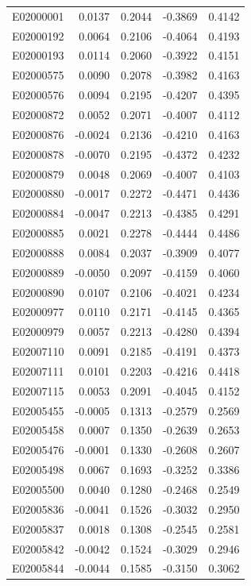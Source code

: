 \documentclass[11pt, a4paper]{article}
\begin{document}
\begin{longtable}{lrrrr}
E02000001 & 0.0137 & 0.2044 & -0.3869 & 0.4142 \\
E02000192 & 0.0064 & 0.2106 & -0.4064 & 0.4193 \\
E02000193 & 0.0114 & 0.2060 & -0.3922 & 0.4151 \\
E02000575 & 0.0090 & 0.2078 & -0.3982 & 0.4163 \\
E02000576 & 0.0094 & 0.2195 & -0.4207 & 0.4395 \\
E02000872 & 0.0052 & 0.2071 & -0.4007 & 0.4112 \\
E02000876 & -0.0024 & 0.2136 & -0.4210 & 0.4163 \\
E02000878 & -0.0070 & 0.2195 & -0.4372 & 0.4232 \\
E02000879 & 0.0048 & 0.2069 & -0.4007 & 0.4103 \\
E02000880 & -0.0017 & 0.2272 & -0.4471 & 0.4436 \\
E02000884 & -0.0047 & 0.2213 & -0.4385 & 0.4291 \\
E02000885 & 0.0021 & 0.2278 & -0.4444 & 0.4486 \\
E02000888 & 0.0084 & 0.2037 & -0.3909 & 0.4077 \\
E02000889 & -0.0050 & 0.2097 & -0.4159 & 0.4060 \\
E02000890 & 0.0107 & 0.2106 & -0.4021 & 0.4234 \\
E02000977 & 0.0110 & 0.2171 & -0.4145 & 0.4365 \\
E02000979 & 0.0057 & 0.2213 & -0.4280 & 0.4394 \\
E02007110 & 0.0091 & 0.2185 & -0.4191 & 0.4373 \\
E02007111 & 0.0101 & 0.2203 & -0.4216 & 0.4418 \\
E02007115 & 0.0053 & 0.2091 & -0.4045 & 0.4152 \\
E02005455 & -0.0005 & 0.1313 & -0.2579 & 0.2569 \\
E02005458 & 0.0007 & 0.1350 & -0.2639 & 0.2653 \\
E02005476 & -0.0001 & 0.1330 & -0.2608 & 0.2607 \\
E02005498 & 0.0067 & 0.1693 & -0.3252 & 0.3386 \\
E02005500 & 0.0040 & 0.1280 & -0.2468 & 0.2549 \\
E02005836 & -0.0041 & 0.1526 & -0.3032 & 0.2950 \\
E02005837 & 0.0018 & 0.1308 & -0.2545 & 0.2581 \\
E02005842 & -0.0042 & 0.1524 & -0.3029 & 0.2946 \\
E02005844 & -0.0044 & 0.1585 & -0.3150 & 0.3062 \\

\end{longtable}
\end{document}
